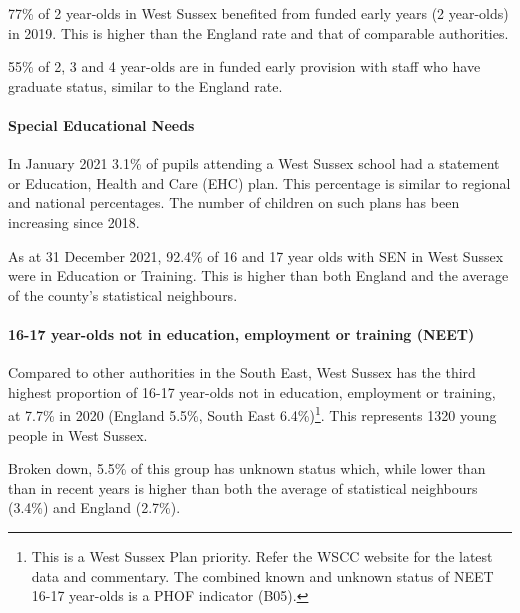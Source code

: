 77\% of 2 year-olds in West Sussex benefited from funded early years (2 year-olds) in 2019. This is higher than the England rate and that of comparable authorities.

55\% of 2, 3 and 4 year-olds are in funded early provision with staff who have graduate status, similar to the England rate.

\paragraph{Special Educational Needs}

In January 2021 3.1\% of pupils attending a West Sussex school had a statement or Education, Health and Care (EHC) plan. This percentage is similar to regional and national percentages. The number of children on such plans has been increasing since 2018.


As at 31 December 2021, 92.4\% of 16 and 17 year olds with SEN in West Sussex were in Education or Training. This is higher than both England and the average of the county's statistical neighbours.

\paragraph{16-17 year-olds not in education, employment or training (NEET)}

Compared to other authorities in the South East, West Sussex has the third highest proportion of 16-17 year-olds not in education, employment or training, at 7.7\% in 2020 (England 5.5\%, South East 6.4\%)\footnote{This is a West Sussex Plan priority. Refer the WSCC website for the latest data and commentary. The combined known and unknown status of NEET 16-17 year-olds is a PHOF indicator (B05).}. This represents 1320 young people in West Sussex.

Broken down, 5.5\% of this group has unknown status which, while lower than than in recent years is higher than both the average of statistical neighbours (3.4\%) and England (2.7\%). 


